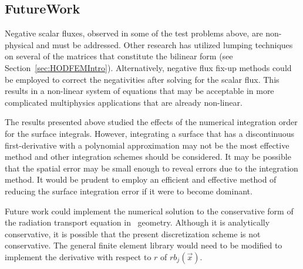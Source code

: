\documentclass[12pt]{article}
\begin{document}
\subsection{FutureWork}
\label{sec:FutureWork}
Negative scalar fluxes, observed in some of the test problems above, are non-physical and must be addressed. Other research has utilized lumping techniques on several of the matrices that constitute the bilinear form (see Section~\ref{sec:HODFEMIntro}). Alternatively, negative flux fix-up methods could be employed to correct the negativities after solving for the scalar flux. This results in a non-linear system of equations that may be acceptable in more complicated multiphysics applications that are already non-linear.

The results presented above studied the effects of the numerical integration order for the surface integrals. However, integrating a surface that has a discontinuous first-derivative with a polynomial approximation may not be the most effective method and other integration schemes should be considered. It may be possible that the spatial error may be small enough to reveal errors due to the integration method. It would be prudent to employ an efficient and effective method of reducing the surface integration error if it were to become dominant.

Future work could implement the numerical solution to the conservative form of the radiation transport equation in \RZ\ geometry. Although it is analytically conservative, it is possible that the present discretization scheme is not conservative. The general finite element library would need to be modified to implement the derivative with respect to $r$ of $r b_j(\vec{x})$.

\begin{comment}
It is common for the solution to the thermal radiation transport equation to be averaged over each mesh zone to be used in the energy balance equation for hydrodynamics calculations. We could also consider cell average spherical symmetry preservation. Also for the spherical symmetry manufactured solution, we would like to develop other manufactured solutions that have simpler manufactured source terms near the origin. The source term that we used was sufficient for $(r,z)$ coordinates further from the origin, but the finite element approximated source term was not close enough to the analytical source near the origin to maintain symmetry. Lastly, the mesh used for the axisymmetry calculations was made entirely of quadrilaterals. That is, even the innermost zones were quadrilaterals with one vertex having a very oblique angle (nearly 180 degrees). We need to modify MFEM to handle mixed element types.
\end{comment}
\end{document}
